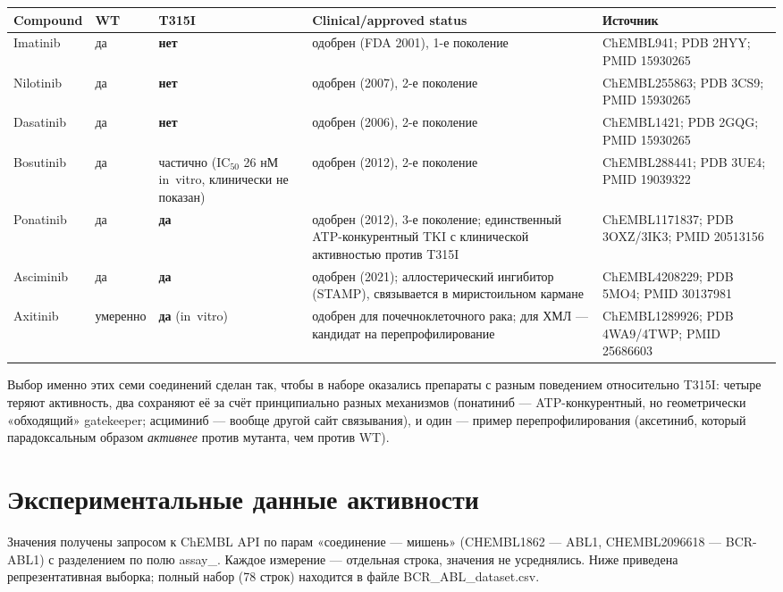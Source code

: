 \documentclass[12pt,a4paper]{article}
\newcommand{\code}[1]{{\ttfamily #1}}
\begin{document}
\begin{center}
\small
\begin{tabular}{L{2.1cm}L{1.6cm}L{2.4cm}L{3.5cm}L{3.6cm}}
\toprule
\textbf{Compound} & \textbf{WT} & \textbf{T315I} & \textbf{Clinical/approved status} & \textbf{Источник} \\
\midrule
Imatinib & да & \textbf{нет} & одобрен (FDA 2001), 1-е поколение & ChEMBL941; PDB 2HYY; PMID 15930265 \\
Nilotinib & да & \textbf{нет} & одобрен (2007), 2-е поколение & ChEMBL255863; PDB 3CS9; PMID 15930265 \\
Dasatinib & да & \textbf{нет} & одобрен (2006), 2-е поколение & ChEMBL1421; PDB 2GQG; PMID 15930265 \\
Bosutinib & да & частично (IC$_{50}$ 26 нМ in~vitro, клинически не показан) & одобрен (2012), 2-е поколение & ChEMBL288441; PDB 3UE4; PMID 19039322 \\
Ponatinib & да & \textbf{да} & одобрен (2012), 3-е поколение; единственный ATP-конкурентный TKI с клинической активностью против T315I & ChEMBL1171837; PDB 3OXZ/3IK3; PMID 20513156 \\
Asciminib & да & \textbf{да} & одобрен (2021); аллостерический ингибитор (STAMP), связывается в миристоильном кармане & ChEMBL4208229; PDB 5MO4; PMID 30137981 \\
Axitinib & умеренно & \textbf{да} (in~vitro) & одобрен для почечноклеточного рака; для ХМЛ --- кандидат на перепрофилирование & ChEMBL1289926; PDB 4WA9/4TWP; PMID 25686603 \\
\bottomrule
\end{tabular}
\end{center}

\medskip
\noindent Выбор именно этих семи соединений сделан так, чтобы в наборе оказались
препараты с разным поведением относительно T315I: четыре теряют активность, два
сохраняют её за счёт принципиально разных механизмов (понатиниб --- ATP-конкурентный,
но геометрически «обходящий» gatekeeper; асциминиб --- вообще другой сайт связывания),
и один --- пример перепрофилирования (аксетиниб, который парадоксальным образом
\emph{активнее} против мутанта, чем против WT).

\section{Экспериментальные данные активности}

Значения получены запросом к ChEMBL API по парам «соединение --- мишень»
(\code{CHEMBL1862} --- ABL1, \code{CHEMBL2096618} --- BCR-ABL1) с разделением по полю
\code{assay\_}\allowbreak\code{variant\_}\allowbreak\code{mutation}. Каждое измерение --- отдельная строка, значения не
усреднялись. Ниже приведена репрезентативная выборка; полный набор (78 строк)
находится в файле \code{BCR\_ABL\_dataset.csv}.
\end{document}
